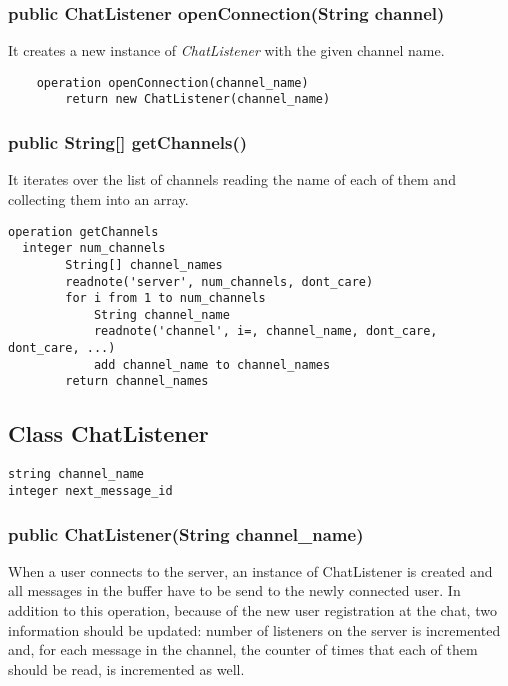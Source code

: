 \documentclass[10pt,a4paper]{article}
\begin{document}
\subsubsection{public ChatListener openConnection(String channel)}
	
It creates a new instance of \textit{ChatListener} with the given channel name.

\begin{verbatim}
	operation openConnection(channel_name)
		return new ChatListener(channel_name)
\end{verbatim}

\subsubsection{public String[] getChannels()}

It iterates over the list of channels reading the name of each of them and collecting them into an array.

\begin{verbatim}
operation getChannels
  integer num_channels
		String[] channel_names
		readnote('server', num_channels, dont_care)
		for i from 1 to num_channels
			String channel_name
			readnote('channel', i=, channel_name, dont_care, dont_care, ...)
			add channel_name to channel_names
		return channel_names
\end{verbatim}


\subsection{Class ChatListener}

\begin{verbatim}
string channel_name
integer next_message_id
\end{verbatim}

\subsubsection{public ChatListener(String channel\_name)}

When a user connects to the server, an instance of ChatListener is created and all messages in the buffer have to be send to the newly connected user. In addition to this operation, because of the new user registration at the chat, two information should be updated: number of listeners on the server is incremented and, for each message in the channel, the counter of times that each of them should be read, is incremented as well.
\end{document}
